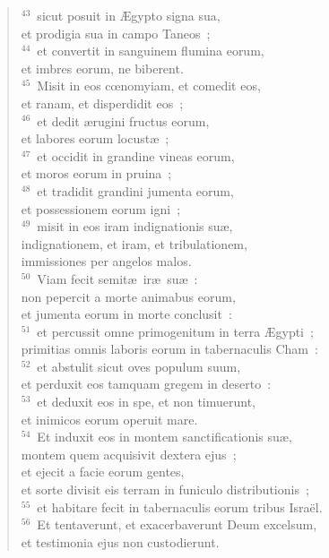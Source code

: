 \begin{verse}
${}^{43}$~sicut posuit in \AE gypto signa sua,\\ et prodigia sua in campo Taneos~;\\
${}^{44}$~et convertit in sanguinem flumina eorum,\\ et imbres eorum, ne biberent.\\
${}^{45}$~Misit in eos cœnomyiam, et comedit eos,\\ et ranam, et disperdidit eos~;\\
${}^{46}$~et dedit \ae rugini fructus eorum,\\ et labores eorum locust\ae~;\\
${}^{47}$~et occidit in grandine vineas eorum,\\ et moros eorum in pruina~;\\
${}^{48}$~et tradidit grandini jumenta eorum,\\ et possessionem eorum igni~;\\
${}^{49}$~misit in eos iram indignationis su\ae ,\\ indignationem, et iram, et tribulationem,\\ immissiones per angelos malos.\\
${}^{50}$~Viam fecit semit\ae\ ir\ae\ su\ae~:\\ non pepercit a morte animabus eorum,\\ et jumenta eorum in morte conclusit~:\\
${}^{51}$~et percussit omne primogenitum in terra \AE gypti~;\\ primitias omnis laboris eorum in tabernaculis Cham~:\\
${}^{52}$~et abstulit sicut oves populum suum,\\ et perduxit eos tamquam gregem in deserto~:\\
${}^{53}$~et deduxit eos in spe, et non timuerunt,\\ et inimicos eorum operuit mare.\\
${}^{54}$~Et induxit eos in montem sanctificationis su\ae ,\\ montem quem acquisivit dextera ejus~;\\ et ejecit a facie eorum gentes,\\ et sorte divisit eis terram in funiculo distributionis~;\\
${}^{55}$~et habitare fecit in tabernaculis eorum tribus Isra\"el.\\
${}^{56}$~Et tentaverunt, et exacerbaverunt Deum excelsum,\\ et testimonia ejus non custodierunt.\\

\end{verse}
